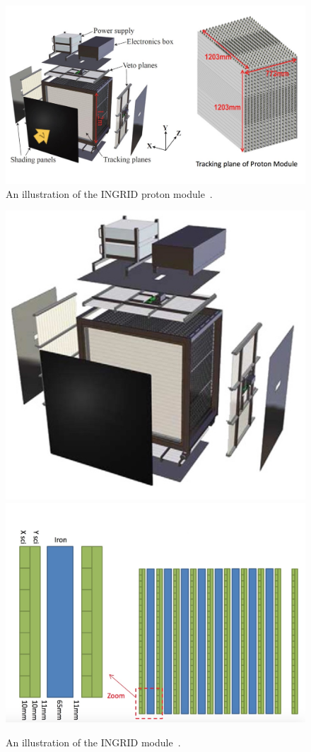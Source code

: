\begin{figure}
\centering
\includegraphics[width=\textwidth]{figures/NeutrinoChap/NuFactTalk/ProtonModule.jpeg}
    \caption{An illustration of the INGRID proton module~\cite{115PrivCom}.}
    \label{fig:IngridProton}
\end{figure}

\begin{figure}
\centering
\includegraphics[width=.49\textwidth]{figures/NeutrinoChap/NuFactTalk/INGRID.jpeg}
\includegraphics[width=.49\textwidth]{figures/NeutrinoChap/NuFactTalk/INGRID2.jpeg}
    \caption{An illustration of the INGRID module~\cite{115PrivCom}.}
    \label{fig:IngridMod}
\end{figure}


